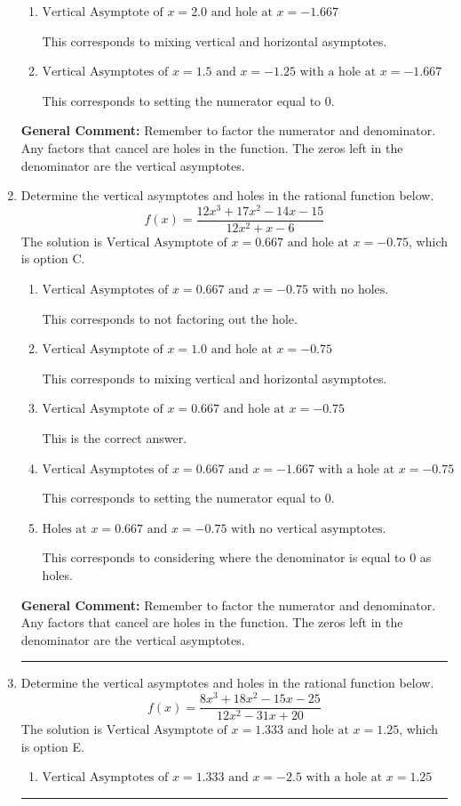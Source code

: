 \documentclass{extbook}[14pt]
\newcommand{\litem}[1]{\item #1

\rule{\textwidth}{0.4pt}}
\begin{document}
\begin{enumerate}
{\begin{enumerate}[label=\Alph*.]
This corresponds to not factoring out the hole.
\item \( \text{Vertical Asymptote of } x = 2.0 \text{ and hole at } x = -1.667 \)

This corresponds to mixing vertical and horizontal asymptotes.
\item \( \text{Vertical Asymptotes of } x = 1.5 \text{ and } x = -1.25 \text{ with a hole at } x = -1.667 \)

This corresponds to setting the numerator equal to 0.
\end{enumerate}

\textbf{General Comment:} Remember to factor the numerator and denominator. Any factors that cancel are holes in the function. The zeros left in the denominator are the vertical asymptotes.
}
\litem{
Determine the vertical asymptotes and holes in the rational function below.
\[ f(x) = \frac{12x^{3} +17 x^{2} -14 x -15}{12x^{2} +x -6} \]The solution is \( \text{Vertical Asymptote of } x = 0.667 \text{ and hole at } x = -0.75 \), which is option C.\begin{enumerate}[label=\Alph*.]
\item \( \text{Vertical Asymptotes of } x = 0.667 \text{ and } x = -0.75 \text{ with no holes.} \)

This corresponds to not factoring out the hole.
\item \( \text{Vertical Asymptote of } x = 1.0 \text{ and hole at } x = -0.75 \)

This corresponds to mixing vertical and horizontal asymptotes.
\item \( \text{Vertical Asymptote of } x = 0.667 \text{ and hole at } x = -0.75 \)

This is the correct answer.
\item \( \text{Vertical Asymptotes of } x = 0.667 \text{ and } x = -1.667 \text{ with a hole at } x = -0.75 \)

This corresponds to setting the numerator equal to 0.
\item \( \text{Holes at } x = 0.667 \text{ and } x = -0.75 \text{ with no vertical asymptotes.} \)

This corresponds to considering where the denominator is equal to 0 as holes.
\end{enumerate}

\textbf{General Comment:} Remember to factor the numerator and denominator. Any factors that cancel are holes in the function. The zeros left in the denominator are the vertical asymptotes.
}
\litem{
Determine the vertical asymptotes and holes in the rational function below.
\[ f(x) = \frac{8x^{3} +18 x^{2} -15 x -25}{12x^{2} -31 x + 20} \]The solution is \( \text{Vertical Asymptote of } x = 1.333 \text{ and hole at } x = 1.25 \), which is option E.\begin{enumerate}[label=\Alph*.]
\item \( \text{Vertical Asymptotes of } x = 1.333 \text{ and } x = -2.5 \text{ with a hole at } x = 1.25 \)


\end{enumerate}}
\end{enumerate}
\end{document}
